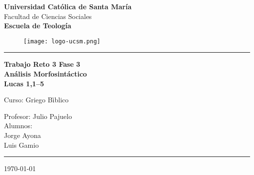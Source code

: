 

\begin{titlepage}
	
	\begin{center}
		\huge \textbf{Universidad Católica de Santa María}\\[1cm]
		
		\large Facultad de Ciencias Sociales\\[3mm]
		\textbf{Escuela de Teología}\\[3mm]
		
		\begin{figure}[h]
			\centering
			\texttt{[image: logo-ucsm.png]}
		\end{figure}		
		\vspace{3mm}
		
		\textcolor{verdelimon} {\rule{\linewidth}{0.5mm}}	
		
		\vspace{4mm}
		{\huge\textbf{Trabajo Reto 3 Fase 3 \\ Análisis Morfosintáctico \\ \large Lucas 1,1–5}}\\
		\vspace{1mm}
		
		\vspace{2mm}
		\large{Curso: Griego Bìblico}\\
		\vspace{2mm}
		
		\large{Profesor: Julio Pajuelo}\\
		\vspace{2mm}
		\vspace{1mm}
		\large{Alumnos:\\ Jorge Ayona \\ Luis Gamio}\\
		\vspace{2mm}
		\textcolor{verdelimon} {\rule{\linewidth}{0.5mm}}	
		\vspace{0.5mm}
		
		{\large {\today}}
		
	\end{center}
	
\end{titlepage}
